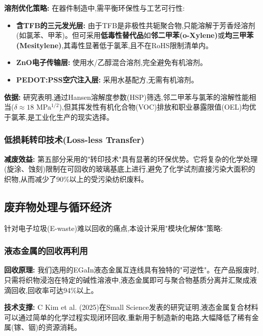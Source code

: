 \documentclass[12pt,a4paper]{article}
\begin{document}
\textbf{溶剂优化策略:} 在器件制造中,需平衡环保性与工艺可行性:

\begin{itemize}
    \item \textbf{含TFB的三元发光层:} 由于TFB是非极性共轭聚合物,只能溶解于芳香烃溶剂(如氯苯、甲苯)。但可采用\textbf{低毒性替代品}如\textbf{邻二甲苯(o-Xylene)}或\textbf{均三甲苯(Mesitylene)},其毒性显著低于氯苯,且不在RoHS限制清单内\cite{kim2022green}。
    
    \item \textbf{ZnO电子传输层:} 使用水/乙醇混合溶剂,完全避免有机溶剂。
    
    \item \textbf{PEDOT:PSS空穴注入层:} 采用水基配方,无需有机溶剂。
\end{itemize}

\textbf{依据:} 研究表明,通过Hansen溶解度参数(HSP)筛选,邻二甲苯与氯苯的溶解性能相当($\delta \approx 18$ MPa$^{1/2}$),但其挥发性有机化合物(VOC)排放和职业暴露限值(OEL)均优于氯苯,是工业化生产的现实选择\cite{kim2022green}。

\subsubsection{低损耗转印技术(Loss-less Transfer)}

\textbf{减废效益:} 第五部分采用的"转印技术"具有显著的环保优势。它将复杂的化学处理(旋涂、蚀刻)限制在可回收的玻璃基底上进行,避免了化学试剂直接污染大面积的织物,从而减少了90\%以上的受污染纺织废料。

\subsection{废弃物处理与循环经济}

针对电子垃圾(E-waste)难以回收的痛点,本设计采用"模块化解体"策略:

\subsubsection{液态金属的回收再利用}

\textbf{回收原理:} 我们选用的EGaIn液态金属互连线具有独特的"可逆性"。在产品报废时,只需将织物浸泡在特定的碱性溶液中,液态金属即可与聚合物基质分离并汇聚成液滴回收,回收率可达94\%以上。

\textbf{技术支撑:} C Kim et al. (2025)在Small Science发表的研究证明,液态金属复合材料可以通过简单的化学过程实现闭环回收,重新用于制造新的电路,大幅降低了稀有金属(镓、铟)的资源消耗\cite{park2025recyclable}。
\end{document}
